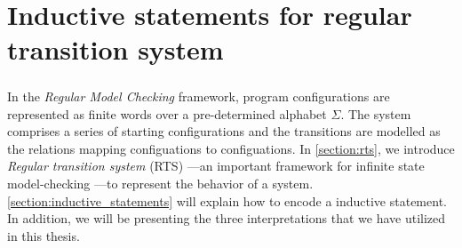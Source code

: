 \chapter{Inductive statements for regular transition system}\label{chapter:inductive_statement}
\paragraph*{}
In the \textit{Regular Model Checking} framework, program configurations are 
represented as finite words over a pre-determined alphabet $\Sigma$.
The system comprises a series of starting configurations and the transitions
are modelled as the relations
mapping configuations to configuations.
In \autoref{section:rts}, we introduce \textit{Regular transition system} (RTS)
—an important framework for infinite state model-checking
—to represent the behavior of a system.
\autoref{section:inductive_statements} will explain how to encode a inductive statement.
In addition, we will be presenting the three interpretations that we have utilized in this thesis.

